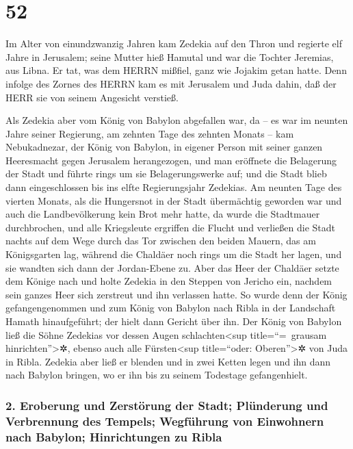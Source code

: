 \hypertarget{section-51}{%
\section{52}\label{section-51}}

Im Alter von einundzwanzig Jahren kam Zedekia auf den
Thron und regierte elf Jahre in Jerusalem; seine Mutter hieß Hamutal und
war die Tochter Jeremias, aus Libna. Er tat, was dem HERRN
mißfiel, ganz wie Jojakim getan hatte. Denn infolge des
Zornes des HERRN kam es mit Jerusalem und Juda dahin, daß der HERR sie
von seinem Angesicht verstieß.

Als Zedekia aber vom König von Babylon abgefallen war, da
-- es war im neunten Jahre seiner Regierung, am zehnten Tage des zehnten
Monats -- kam Nebukadnezar, der König von Babylon, in eigener Person mit
seiner ganzen Heeresmacht gegen Jerusalem herangezogen, und man
eröffnete die Belagerung der Stadt und führte rings um sie
Belagerungswerke auf; und die Stadt blieb dann
eingeschlossen bis ins elfte Regierungsjahr Zedekias. Am
neunten Tage des vierten Monats, als die Hungersnot in der Stadt
übermächtig geworden war und auch die Landbevölkerung kein Brot mehr
hatte, da wurde die Stadtmauer durchbrochen, und alle
Kriegsleute ergriffen die Flucht und verließen die Stadt nachts auf dem
Wege durch das Tor zwischen den beiden Mauern, das am Königsgarten lag,
während die Chaldäer noch rings um die Stadt her lagen, und sie wandten
sich dann der Jordan-Ebene zu. Aber das Heer der Chaldäer
setzte dem Könige nach und holte Zedekia in den Steppen von Jericho ein,
nachdem sein ganzes Heer sich zerstreut und ihn verlassen hatte.
So wurde denn der König gefangengenommen und zum König von
Babylon nach Ribla in der Landschaft Hamath hinaufgeführt; der hielt
dann Gericht über ihn. Der König von Babylon ließ die
Söhne Zedekias vor dessen Augen schlachten\textless sup
title=``=~grausam hinrichten''\textgreater✲, ebenso auch alle
Fürsten\textless sup title=``oder: Oberen''\textgreater✲ von Juda in
Ribla. Zedekia aber ließ er blenden und in zwei Ketten
legen und ihn dann nach Babylon bringen, wo er ihn bis zu seinem
Todestage gefangenhielt.

\hypertarget{eroberung-und-zerstuxf6rung-der-stadt-pluxfcnderung-und-verbrennung-des-tempels-wegfuxfchrung-von-einwohnern-nach-babylon-hinrichtungen-zu-ribla}{%
\subsubsection{2. Eroberung und Zerstörung der Stadt; Plünderung und
Verbrennung des Tempels; Wegführung von Einwohnern nach Babylon;
Hinrichtungen zu
Ribla}\label{eroberung-und-zerstuxf6rung-der-stadt-pluxfcnderung-und-verbrennung-des-tempels-wegfuxfchrung-von-einwohnern-nach-babylon-hinrichtungen-zu-ribla}}

